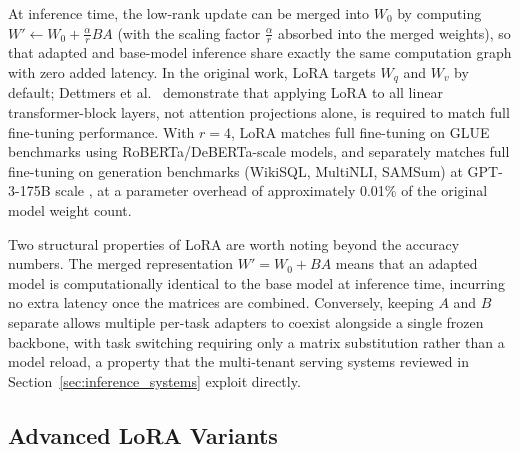 At inference time, the low-rank update can be merged into $W_0$ by computing
$W' \leftarrow W_0 + \frac{\alpha}{r}BA$ (with the scaling factor $\frac{\alpha}{r}$ absorbed into the merged weights), so that adapted and base-model inference share
exactly the same computation graph with zero added latency. In the original work, LoRA targets
$W_q$ and $W_v$ by default; Dettmers et al.~\cite{Dettmers2023} demonstrate that applying
LoRA to all linear transformer-block layers, not attention projections alone, is required
to match full fine-tuning performance. With $r = 4$, LoRA matches full fine-tuning on GLUE benchmarks using
RoBERTa/DeBERTa-scale models, and separately matches full fine-tuning on
generation benchmarks (WikiSQL, MultiNLI, SAMSum) at GPT-3-175B scale
\cite{Hu2022}, at a parameter overhead of
approximately 0.01\% of the original model weight count.

Two structural properties of LoRA are worth noting beyond the accuracy numbers. The merged
representation $W' = W_0 + BA$ means that an adapted model is computationally identical to
the base model at inference time, incurring no extra latency once the matrices are combined.
Conversely, keeping $A$ and $B$ separate allows multiple per-task adapters to coexist
alongside a single frozen backbone, with task switching requiring only a matrix substitution
rather than a model reload, a property that the multi-tenant serving systems reviewed in
Section~\ref{sec:inference_systems} exploit directly.

\subsection{Advanced LoRA Variants}
\label{sec:peft:lora_variants}


